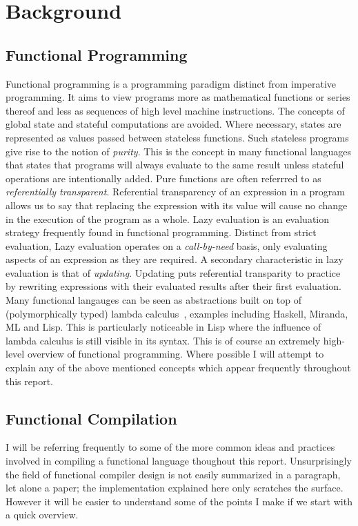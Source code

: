 
\section{Background}
\subsection{Functional Programming}
Functional programming is a programming paradigm distinct from imperative
programming. It aims to view programs more as mathematical functions or series
thereof and less as sequences of high level machine instructions. The concepts
of global state and stateful computations are avoided. Where necessary, states
are represented as values passed between stateless functions. Such stateless
programs give rise to the notion of \emph{purity}. This is the concept in many functional
languages that states that programs will always evaluate to the same result unless
stateful operations are intentionally added. Pure functions are often referrred
to as \emph{referentially transparent}. Referential transparency of an expression in a
program allows us to say that replacing the expression with its value will cause
no change in the execution of the program as a whole. Lazy evaluation is an
evaluation strategy frequently found in functional programming. Distinct from
strict evaluation, Lazy evaluation operates on a \emph{call-by-need} basis, only
evaluating aspects of an expression as they are required. A secondary characteristic
in lazy evaluation is that of \emph{updating}. Updating puts referential
transparity to practice by rewriting expressions with their evaluated results after
their first evaluation. Many functional langauges can be seen as abstractions built
on top of (polymorphically typed) lambda calculus~\cite[pp.37]{SPJ}, examples including 
Haskell, Miranda, ML and Lisp. This is particularly noticeable in Lisp where the 
influence of lambda calculus is still visible in its syntax. This is of course 
an extremely high-level overview of functional programming. Where possible I will attempt to explain 
any of the above mentioned concepts which appear frequently throughout this report. 

\subsection{Functional Compilation}
I will be referring frequently to some of the more common ideas and practices
involved in compiling a functional language thoughout this report. Unsurprisingly
the field of functional compiler design is not easily summarized in a paragraph,
let alone a paper; the implementation explained here only scratches the surface.
However it will be easier to understand some of the points I make if we start
with a quick overview.

